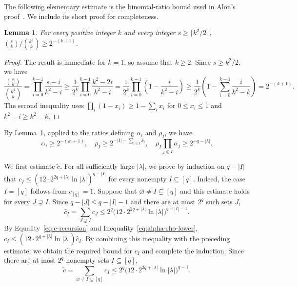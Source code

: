 \documentclass[10pt,a4paper]{amsart}
\numberwithin{equation}{section}
\newtheorem{lemma}[theorem]{Lemma}
\begin{document}
 
The following elementary estimate is the binomial-ratio bound used in
Alon's proof~\cite{Alon2000}. We include its short proof for completeness.

\begin{lemma}\label{lem:half-binomial-ratio}
	For every positive integer $k$ and every integer
	$s\geq\lceil k^2/2\rceil$, $\binom{s}{k}/\binom{k^2}{k} \geq 2^{-(k+1)}$.
\end{lemma} 
\begin{proof}
	The result is immediate for $k=1$, so assume that $k\geq2$. Since $s\geq k^2/2$, we have
	\[ 
	\frac{\binom{s}{k}}{\binom{k^2}{k}} =  \prod_{i=0}^{k-1}\frac{s-i}{k^2-i} \geq \frac{1}{2^k}\prod_{i=0}^{k-1}\frac{k^2-2i}{k^2-i} =
	\frac{1}{2^k}\prod_{i=0}^{k-1}\left(1-\frac{i}{k^2-i}\right) \geq  \frac{1}{2^k}\left(1-\sum_{i=0}^{k-1}\frac{i}{k^2-k}\right)  =2^{-(k+1)}. 
	\]
	The second inequality uses $\prod_i(1-x_i)\geq1-\sum_i x_i$ for $0\leq x_i\leq1$ and
	$k^2-i\geq k^2-k$.
\end{proof} 

By Lemma~\ref{lem:half-binomial-ratio}, applied to the ratios defining
$\alpha_i$ and $\rho_I$, we have
\begin{equation}\label{eq:alpha-rho-lower}
 \alpha_i\geq2^{-(k_i+1)},
 \quad
 \rho_I\geq2^{-|I|-\sum_{i\in I}k_i},
 \quad
 \rho_I\prod_{j\notin I}\alpha_j\geq2^{-q-|\lambda|}.
\end{equation}

We first estimate $\widetilde c$. For all sufficiently large $|\lambda|$, we
prove by induction on $q-|I|$ that
$c_I\leq(12\cdot 2^{2q+|\lambda|}\ln|\lambda|)^{q-|I|}$ for every nonempty
$I\subseteq[q]$.
Indeed, the case $I=[q]$ follows from $c_{[q]}=1$. Suppose that
$\varnothing\ne I\subsetneq[q]$ and this estimate holds for every $J\supsetneq I$. Since
$q-|J|\leq q-|I|-1$ and there are at most $2^q$ such sets $J$,
\[
 \hat c_I=\sum_{J\supsetneq I}c_J
 \leq2^q
 \bigl(12\cdot 2^{2q+|\lambda|}\ln|\lambda|\bigr)^{q-|I|-1}.
\]
By Equality~\eqref{eq:c-recursion} and Inequality~\eqref{eq:alpha-rho-lower},
$c_I\leq(12\cdot 2^{q+|\lambda|}\ln|\lambda|)\hat c_I$. By combining this
inequality with the preceding estimate, we obtain the required bound for
$c_I$ and complete the induction. Since there are at most
$2^q$ nonempty sets $I\subseteq[q]$,
\begin{equation}\label{eq:ctilde-explicit-bound}
 \widetilde c
 =\sum_{\varnothing\ne I\subseteq[q]}c_I
 \leq2^q
 \bigl(12\cdot 2^{2q+|\lambda|}\ln|\lambda|\bigr)^{q-1}.
\end{equation}
\end{document}

